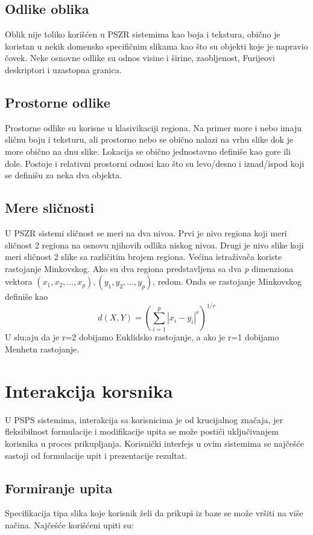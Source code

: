 \documentclass{article}
\begin{document}
\subsection{Odlike oblika}
Oblik nije toliko korišćen u PSZR sistemima kao boja i tekstura, obično je koristan u nekik domensko specifičnim slikama kao što su objekti koje je napravio čovek. Neke osnovne odlike su odnos visine i širine, zaobljenost, Furijeovi deskriptori i uzastopna granica.

\subsection{Prostorne odlike}
Prostorne odlike su korisne u klasivikaciji regiona. Na primer more i nebo imaju sličnu boju i teksturu, ali prostorno nebo se obično nalazi na vrhu slike dok je more obično na dnu slike. Lokacija se obično jednostavno definiše kao gore ili dole. Postoje i relativni prostorni odnosi kao što su levo/desno i iznad/ispod koji se definišu za neka dva objekta.

\subsection{Mere sličnosti}
U PSZR sistemi sličnost se meri na dva nivoa. Prvi je nivo regiona koji meri sličnost 2 regiona na osnovu njihovih odlika niskog nivoa. Drugi je nivo slike koji meri sličnost 2 slike sa različitim brojem regiona. Većina istraživača koriste rastojanje Minkovskog. Ako su dva regiona predstavljena sa dva \textit{p} dimenziona vektora \textit{$(x_{1},x_{2},...,x_{p}), (y_{1},y_{2},...,y_{p})$}, redom. Onda se rastojanje Minkovskog definiše kao
$$ d(X,Y) = (\sum_{i=1}^{p} {|x_{i}-y_{i}|}^{r})^{1/r} $$
U slu;aju da je r=2 dobijamo Euklidsko rastojanje, a ako je r=1 dobijamo Menhetn rastojanje.

\section{Interakcija korsnika}
U PSPS sistemima, interakcija sa korisnicima je od krucijalnog značaja, jer fleksibilnost formulacije i modifikacije upita se može postići uključivanjem korisnika u proces prikupljanja. Korisnički interfejs u ovim sistemima se najčešće sastoji od formulacije upit i prezentacije rezultat.

\subsection{Formiranje upita}
Specifikacija tipa slika koje korisnik želi da prikupi iz baze se može vršiti na više načina. Najčešće korišćeni upiti su:
\end{document}
